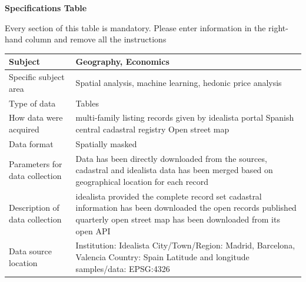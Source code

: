 \documentclass[times,final]{elsarticle}
\begin{document}
{\fontsize{7.5pt}{9pt}\selectfont
\noindent\textbf{Specifications Table}

Every section of this table is mandatory.
Please enter information in the right-hand column and remove all the instructions
\begin{longtable}{|p{33mm}|p{94mm}|}
\hline
\endhead
\hline
\endfoot
Subject                & Geography, Economics\\
\hline
Specific subject area  & Spatial analysis, machine learning, hedonic price analysis\\
\hline
Type of data           & Tables\newline\\
How data were acquired & multi-family listing records given by idealista portal \cite{idealista}\newline
                         Spanish central cadastral registry \cite{Catastro}\newline
                         Open street map \cite{OpenStreetMap}\newline
\\
\hline
Data format            & Spatially masked\\
\hline
Parameters for
data\newline
collection             & Data has been directly downloaded from the sources, cadastral and idealista data has been merged based on geographical location for each record
\\

\hline
Description of
data\newline
collection             & idealista provided the complete record set \newline
                         cadastral information has been downloaded the open records published quarterly\newline
                         open street map has been downloaded from its open API
\\
\hline
Data source location   & Institution: Idealista\newline
                         City/Town/Region: Madrid, Barcelona, Valencia\newline
                         Country: Spain\newline
                         Latitude and longitude samples/data: EPSG:4326\newline
\\


\end{longtable}}
\end{document}
